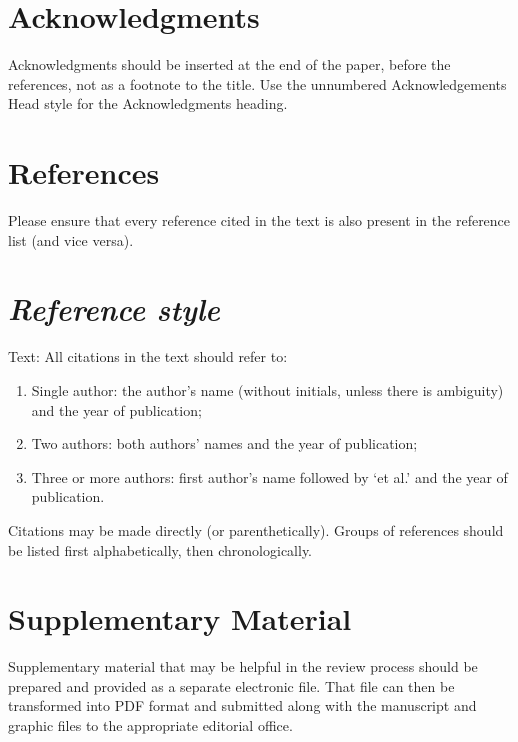 \documentclass[times,referee,twocolumn,final,authoryear]{elsarticle}
\begin{document}
\section*{Acknowledgments}
Acknowledgments should be inserted at the end of the paper, before the
references, not as a footnote to the title. Use the unnumbered
Acknowledgements Head style for the Acknowledgments heading.

\section*{References}

Please ensure that every reference cited in the text is also present in
the reference list (and vice versa).

\section*{\itshape Reference style}

Text: All citations in the text should refer to:
\begin{enumerate}
\item Single author: the author's name (without initials, unless there
is ambiguity) and the year of publication;
\item Two authors: both authors' names and the year of publication;
\item Three or more authors: first author's name followed by `et al.'
and the year of publication.
\end{enumerate}
Citations may be made directly (or parenthetically). Groups of
references should be listed first alphabetically, then chronologically.




\section*{Supplementary Material}

Supplementary material that may be helpful in the review process should
be prepared and provided as a separate electronic file. That file can
then be transformed into PDF format and submitted along with the
manuscript and graphic files to the appropriate editorial office.
\end{document}
